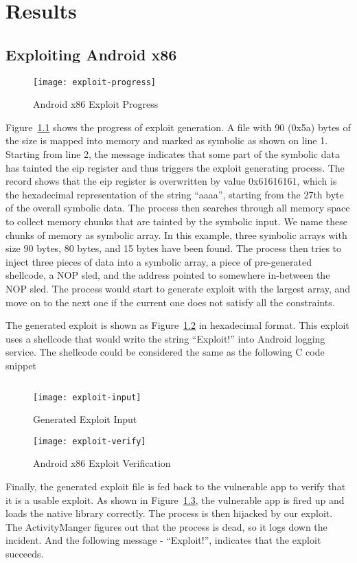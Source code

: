 \chapter{Results}

\section{Exploiting Android x86}

\begin{figure}[!ht]
  \texttt{[image: exploit-progress]}
  \caption{Android x86 Exploit Progress}
  \label{fig:exploit-progress}
\end{figure}

Figure~\ref{fig:exploit-progress} shows the progress of exploit generation. A
file with 90 (0x5a) bytes of the size is mapped into memory and marked as
symbolic as shown on line 1. Starting from line 2, the message indicates that
some part of the symbolic data has tainted the eip register and thus triggers
the exploit generating process. The record shows that the eip register is
overwritten by value 0x61616161, which is the hexadecimal representation of the
string ``aaaa'', starting from the 27th byte of the overall symbolic data.
The process then searches through all memory space to collect memory chunks
that are tainted by the symbolic input. We name these chunks of memory as
symbolic array. In this example, three symbolic arrays with size 90 bytes, 80
bytes, and 15 bytes have been found. The process then tries to inject three
pieces of data into a symbolic array, a piece of pre-generated shellcode, a NOP
sled, and the address pointed to somewhere in-between the NOP sled. The process
would start to generate exploit with the largest array, and move on to the next
one if the current one does not satisfy all the constraints.

The generated exploit is shown as Figure~\ref{fig:exploit-input} in hexadecimal
format. This exploit uses a shellcode that would write the string ``Exploit!''
into Android logging service. The shellcode could be considered the same as
the following C code snippet

\inputminted[fontsize=\footnotesize]{c}{source/execve-log.c}

\begin{figure}[!ht]
  \texttt{[image: exploit-input]}
  \caption{Generated Exploit Input}
  \label{fig:exploit-input}
\end{figure}

\begin{figure}[!ht]
  \texttt{[image: exploit-verify]}
  \caption{Android x86 Exploit Verification}
  \label{fig:exploit-verify}
\end{figure}

Finally, the generated exploit file is fed back to the vulnerable app to verify
that it is a usable exploit. As shown in Figure~\ref{fig:exploit-verify}, the
vulnerable app is fired up and loads the native library correctly. The process
is then hijacked by our exploit. The ActivityManger figures out that the
process is dead, so it logs down the incident. And the following message -
``Exploit!'', indicates that the exploit succeeds.

